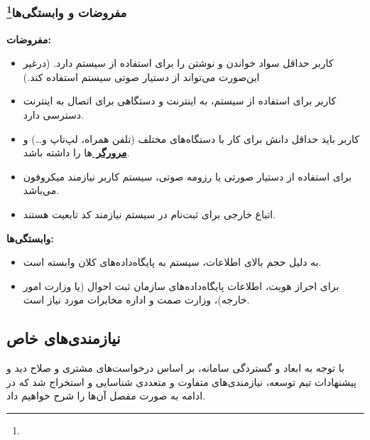\documentclass[12pt]{article}
\begin{document}
	\subsubsection{مفروضات و وابستگی‌ها\footnote{}}
	\textbf{مفروضات:}
	\begin{itemize}
		\item
		کاربر حداقل سواد خواندن و نوشتن را برای استفاده از سیستم دارد. (درغیر این‌صورت می‌تواند از دستیار صوتی سیستم استفاده کند.)
		\item
		کاربر برای استفاده از سیستم، به اینترنت و دستگاهی برای اتصال به اینترنت دسترسی دارد.
		\item
		کاربر باید حداقل دانش برای کار با دستگاه‌های مختلف (تلفن همراه، لپ‌تاپ و…) و \textbf{\hyperref[ref:browser]{مرورگر }}ها را داشته باشد.
		\item
		برای استفاده از دستیار صورتی یا رزومه صوتی، سیستم کاربر نیازمند میکروفون می‌باشد.
		\item
		اتباع خارجی برای ثبت‌نام در سیستم نیازمند کد تابعیت هستند.
	\end{itemize}
	\textbf{وابستگی‌ها:}
	\begin{itemize}
		\item
		به دلیل حجم بالای اطلاعات، سیستم به پایگاه‌داده‌های کلان وابسته است.
		\item
		برای احراز هویت، اطلاعات پایگاه‌داده‌های سازمان ثبت احوال (یا وزارت امور خارجه)، وزارت صمت و اداره مخابرات مورد‌ نیاز است.
	\end{itemize}

	\newpage
	\subsection{نیازمندی‌های خاص}
	با توجه به ابعاد و گستردگی سامانه، بر اساس درخواست‌های مشتری و صلاح دید و پیشنهادات تیم توسعه، نیازمندی‌های متفاوت و متعددی شناسایی و استخراج شد که در ادامه به صورت مفصل آن‌ها را شرح خواهیم داد.
\end{document}

